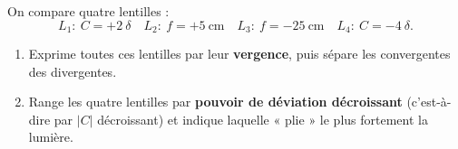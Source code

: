 \documentclass[11pt,a4paper]{article}
\begin{document}
\begin{exo}
On compare quatre lentilles :
\[ L_1:\ C=+2~\delta\quad L_2:\ f=+\qty{5}{\cm}\quad L_3:\ f=-\qty{25}{\cm}\quad L_4:\ C=-4~\delta. \]
\begin{enumerate}[label=\alph*)]
  \item Exprime toutes ces lentilles par leur \textbf{vergence}, puis sépare les convergentes des
        divergentes.
  \item Range les quatre lentilles par \textbf{pouvoir de déviation décroissant} (c'est-à-dire par
        $|C|$ décroissant) et indique laquelle « plie » le plus fortement la lumière.
\end{enumerate}
\end{exo}
\end{document}
